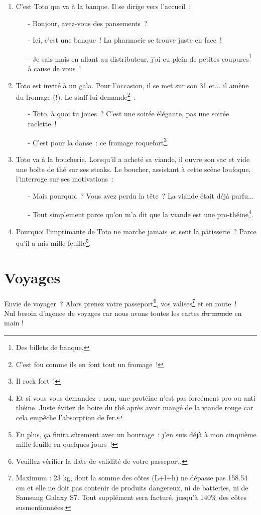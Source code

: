 \documentclass[10pt,a5paper,fullpage]{book}
\begin{document}
\begin{enumerate}
		\item C’est Toto qui va à la banque. Il se dirige vers l’accueil~:
		\begin{itemize}
			\item[-] Bonjour, avez-vous des pansements~?
			\item[-] Ici, c’est une banque~! La pharmacie se trouve juste en face~!
			\item[-] Je sais mais en allant au distributeur, j'ai eu plein de petites coupures\footnote{Des billets de banque.} à cause de vous~!
		\end{itemize}
		
		\item Toto est invité à un gala. Pour l'occasion, il se met sur son 31 et... il amène du fromage (!). Le staff lui demande\footnote{C'est fou comme ils en font tout un fromage~!}~:
		\begin{itemize}
			\item[-] Toto, à quoi tu joues~? C'est une soirée élégante, pas une soirée raclette~!
			\item[-] C'est pour la danse~: ce fromage roquefort\footnote{Il rock fort~!}.
		\end{itemize}
		
		\item Toto va à la boucherie. Lorsqu'il a acheté sa viande, il ouvre son sac et vide une boîte de thé sur ses steaks. Le boucher, assistant à cette scène loufoque, l'interroge sur ses motivations~:
		\begin{itemize}
			\item[-] Mais pourquoi~? Vous avez perdu la tête~? La viande était déjà parfu...
			\item[-] Tout simplement parce qu'on m'a dit que la viande est une pro-théine\footnote{Et si vous vous demandez~: non, une protéine n'est pas forcément pro ou anti théine. Juste évitez de boire du thé après avoir mangé de la viande rouge car cela empêche l'absorption de fer. }. 
		\end{itemize}
		
		\item Pourquoi l’imprimante de Toto ne marche jamais et sent la pâtisserie~? Parce qu’il a mis mille-feuille\footnote{En plus, ça finira sûrement avec un bourrage~: j'en suis déjà à mon cinquième mille-feuille en quelques jours~!}.
	\end{enumerate}
	
	\chapter{Voyages}
	Envie de voyager~? Alors prenez votre passeport\footnote{Veuillez vérifier la date de validité de votre passeport.}, vos valises\footnote{Maximum : 23 kg, dont la somme des côtes (L+l+h) ne dépasse pas 158.54 cm et elle ne doit pas contenir de produits dangereux, ni de batteries, ni de Samsung Galaxy S7. Tout supplément sera facturé, jusqu'à 140\% des côtes susmentionnées.} et en route~!
	\\Nul besoin d'agence de voyages car nous avons toutes les cartes \sout{du monde} en main ! 
	
\end{document}
